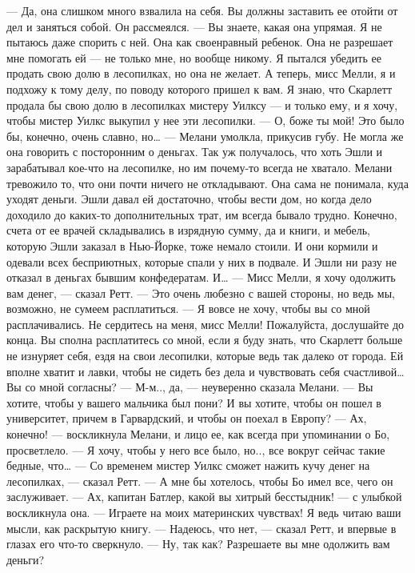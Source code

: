 — Да, она слишком много взвалила на себя. Вы должны заставить ее отойти от дел и заняться собой. Он рассмеялся.
— Вы знаете, какая она упрямая. Я не пытаюсь даже спорить с ней. Она как своенравный ребенок. Она не разрешает мне помогать ей — не только мне, но вообще никому. Я пытался убедить ее продать свою долю в лесопилках, но она не желает. А теперь, мисс Мелли, я и подхожу к тому делу, по поводу которого пришел к вам. Я знаю, что Скарлетт продала бы свою долю в лесопилках мистеру Уилксу — и только ему, и я хочу, чтобы мистер Уилкс выкупил у нее эти лесопилки.
— О, боже ты мой! Это было бы, конечно, очень славно, но… — Мелани умолкла, прикусив губу. Не могла же она говорить с посторонним о деньгах. Так уж получалось, что хоть Эшли и зарабатывал кое-что на лесопилке, но им почему-то всегда не хватало. Мелани тревожило то, что они почти ничего не откладывают. Она сама не понимала, куда уходят деньги. Эшли давал ей достаточно, чтобы вести дом, но когда дело доходило до каких-то дополнительных трат, им всегда бывало трудно. Конечно, счета от ее врачей складывались в изрядную сумму, да и книги, и мебель, которую Эшли заказал в Нью-Йорке, тоже немало стоили. И они кормили и одевали всех бесприютных, которые спали у них в подвале. И Эшли ни разу не отказал в деньгах бывшим конфедератам. И…
— Мисс Мелли, я хочу одолжить вам денег, — сказал Ретт.
— Это очень любезно с вашей стороны, но ведь мы, возможно, не сумеем расплатиться.
— Я вовсе не хочу, чтобы вы со мной расплачивались. Не сердитесь на меня, мисс Мелли! Пожалуйста, дослушайте до конца. Вы сполна расплатитесь со мной, если я буду знать, что Скарлетт больше не изнуряет себя, ездя на свои лесопилки, которые ведь так далеко от города. Ей вполне хватит и лавки, чтобы не сидеть без дела и чувствовать себя счастливой… Вы со мной согласны?
— М-м.., да, — неуверенно сказала Мелани.
— Вы хотите, чтобы у вашего мальчика был пони? И вы хотите, чтобы он пошел в университет, причем в Гарвардский, и чтобы он поехал в Европу?
— Ах, конечно! — воскликнула Мелани, и лицо ее, как всегда при упоминании о Бо, просветлело. — Я хочу, чтобы у него все было, но.., все вокруг сейчас такие бедные, что…
— Со временем мистер Уилкс сможет нажить кучу денег на лесопилках, — сказал Ретт. — А мне бы хотелось, чтобы Бо имел все, чего он заслуживает.
— Ах, капитан Батлер, какой вы хитрый бесстыдник! — с улыбкой воскликнула она. — Играете на моих материнских чувствах! Я ведь читаю ваши мысли, как раскрытую книгу.
— Надеюсь, что нет, — сказал Ретт, и впервые в глазах его что-то сверкнуло. — Ну, так как? Разрешаете вы мне одолжить вам деньги?
